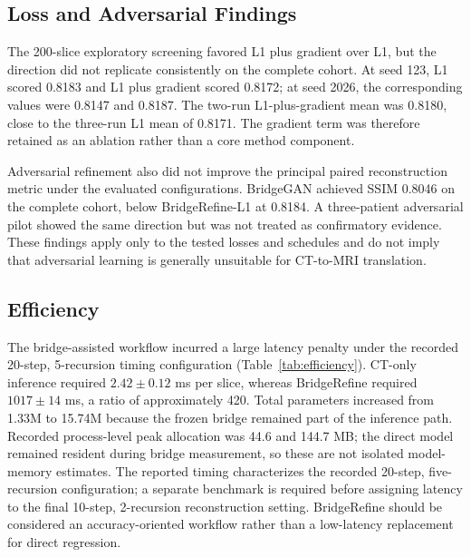 \subsection{Loss and Adversarial Findings}

The 200-slice exploratory screening favored L1 plus gradient over L1, but the direction did not replicate consistently on the complete cohort. At seed 123, L1 scored 0.8183 and L1 plus gradient scored 0.8172; at seed 2026, the corresponding values were 0.8147 and 0.8187. The two-run L1-plus-gradient mean was 0.8180, close to the three-run L1 mean of 0.8171. The gradient term was therefore retained as an ablation rather than a core method component.

Adversarial refinement also did not improve the principal paired reconstruction metric under the evaluated configurations. BridgeGAN achieved SSIM 0.8046 on the complete cohort, below BridgeRefine-L1 at 0.8184. A three-patient adversarial pilot showed the same direction but was not treated as confirmatory evidence. These findings apply only to the tested losses and schedules and do not imply that adversarial learning is generally unsuitable for CT-to-MRI translation.

\subsection{Efficiency}

The bridge-assisted workflow incurred a large latency penalty under the recorded 20-step, 5-recursion timing configuration (Table~\ref{tab:efficiency}). CT-only inference required $2.42\pm0.12$ ms per slice, whereas BridgeRefine required $1017\pm14$ ms, a ratio of approximately 420. Total parameters increased from 1.33M to 15.74M because the frozen bridge remained part of the inference path. Recorded process-level peak allocation was 44.6 and 144.7 MB; the direct model remained resident during bridge measurement, so these are not isolated model-memory estimates. The reported timing characterizes the recorded 20-step, five-recursion configuration; a separate benchmark is required before assigning latency to the final 10-step, 2-recursion reconstruction setting. BridgeRefine should be considered an accuracy-oriented workflow rather than a low-latency replacement for direct regression.

